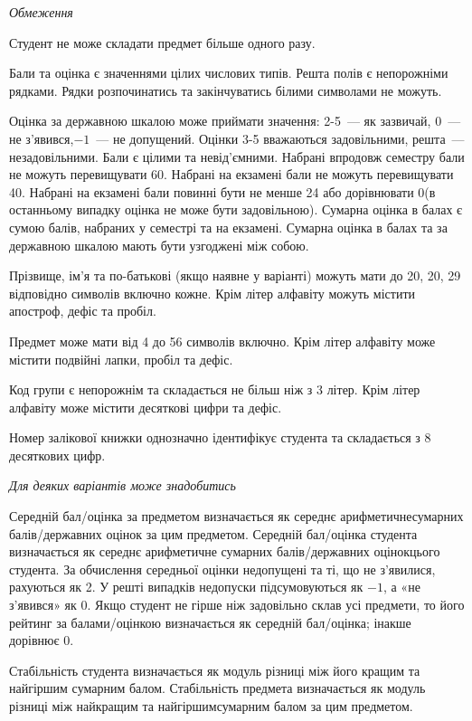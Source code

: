 \documentclass[11pt, ukrainian]{article}
\begin{document}

\bigskip\textit{Обмеження}

Студент не може складати предмет більше одного разу.

Бали та оцінка є значеннями цілих числових типів. Решта полів є непорожніми рядками.
Рядки розпочинатись та закінчуватись білими символами не можуть.

Оцінка за державною шкалою може приймати значення: 2-5~--- як зазвичай, 0~--- не з’явився,$-1$~--- не допущений. 
Оцінки 3-5 вважаються задовільними, решта~--- незадовільними. 
Бали є цілими та невід’ємними.
Набрані впродовж семестру бали не можуть перевищувати 60. 
Набрані на екзамені бали не можуть перевищувати 40. 
Набрані на екзамені бали повинні бути не менше 24 або дорівнювати 0(в останньому випадку оцінка не може бути задовільною). 
Сумарна оцінка в балах є сумою балів, набраних у семестрі та на екзамені.
Сумарна оцінка в балах та за державною шкалою мають бути узгоджені між собою.

Прізвище, ім’я та по-батькові (якщо наявне у варіанті) можуть мати до 20, 20, 29 відповідно символів включно кожне. 
Крім літер алфавіту можуть містити апостроф, дефіс та пробіл.

Предмет може мати від 4 до 56 символів включно. 
Крім літер алфавіту може містити подвійні лапки, пробіл та дефіс.

Код групи є непорожнім та складається не більш ніж з 3 літер. 
Крім літер алфавіту може містити десяткові цифри та дефіс.


Номер залікової книжки однозначно ідентифікує студента та складається з 8 десяткових цифр. 

\bigskip\textit{Для деяких варіантів може знадобитись}

Середній бал/оцінка за предметом визначається як середнє арифметичнесумарних балів/державних оцінок за цим предметом. 
Середній бал/оцінка студента визначається як середнє арифметичне сумарних балів/державних оцінокцього студента. 
За обчислення середньої оцінки недопущені та ті, що не з’явилися, рахуються як 2.
У решті випадків недопуски підсумовуються як $-1$, а «не з’явився» як 0.
Якщо студент не гірше ніж задовільно склав усі предмети, 
то його рейтинг за балами/оцінкою визначається як середній бал/оцінка; інакше дорівнює 0.

Стабільність студента визначається як модуль різниці між його кращим та найгіршим сумарним балом.
Стабільність предмета визначається як модуль різниці між найкращим та найгіршимсумарним балом за цим предметом.
\end{document}
